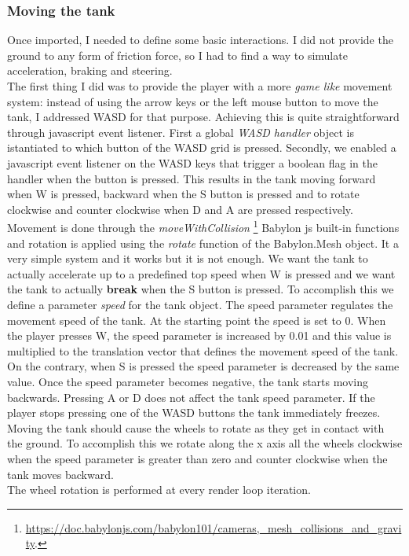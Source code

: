 \documentclass[14pt]{article}
\begin{document}
\subsubsection{Moving the tank}
Once imported, I needed to define some basic interactions. I did not provide the ground to any form of friction force, so I had to find a way to simulate acceleration, braking and steering. \\
The first thing I did was to provide the player with a more \textit{game like} movement system: instead of using the arrow keys or the left mouse button to move the tank, I addressed WASD for that purpose. Achieving this is quite straightforward through javascript event listener. First a global \textit{WASD handler} object is istantiated to  which button of the WASD grid is pressed. Secondly, we enabled a javascript event listener on the WASD keys that trigger a boolean flag in the handler when the button is pressed. This results in the tank moving forward when W is pressed, backward when the S button is pressed and to rotate clockwise and counter clockwise when D and A are pressed respectively. Movement is done through the \textit{moveWithCollision} 
\footnote{\url{https://doc.babylonjs.com/babylon101/cameras,_mesh_collisions_and_gravity}.}
Babylon js built-in functions and rotation is applied using the \textit{rotate} function of the Babylon.Mesh object. It a very simple system and it works but it is not enough. We want the tank to actually accelerate up to a predefined top speed when W is pressed and we want the tank to actually \textbf{break} when the S button is pressed. To accomplish this we define a parameter \textit{speed} for the tank object. The speed parameter regulates the movement speed of the tank. At the starting point the speed is set to 0. When the player presses W, the speed parameter is increased by 0.01 and this value is multiplied to the translation vector that defines the movement speed of the tank. On the contrary, when S is pressed the speed parameter is decreased by the same value. Once the speed parameter becomes negative, the tank starts moving backwards. Pressing A or D does not affect the tank speed parameter. If the player stops pressing one of the WASD buttons the tank immediately freezes. \\
Moving the tank should cause the wheels to rotate as they get in contact with the ground. To accomplish this we rotate along the x axis all the wheels clockwise when the speed parameter is greater than zero and counter clockwise when the tank moves backward.\\
The wheel rotation is performed at every render loop iteration.\\
\end{document}
